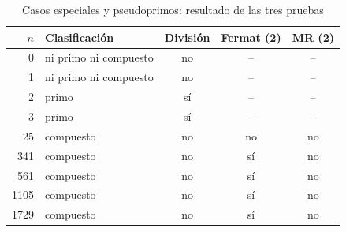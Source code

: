 \begin{table}[H]\centering\small
\caption{Casos especiales y pseudoprimos: resultado de las tres pruebas}
\label{tab:casos_propuesto1}
\begin{tabular}{rlccc}\toprule
$n$ & Clasificación & División & Fermat (2) & MR (2) \\
\midrule
0 & ni primo ni compuesto & no & -- & -- \\
1 & ni primo ni compuesto & no & -- & -- \\
2 & primo & sí & -- & -- \\
3 & primo & sí & -- & -- \\
25 & compuesto & no & no & no \\
341 & compuesto & no & sí & no \\
561 & compuesto & no & sí & no \\
1105 & compuesto & no & sí & no \\
1729 & compuesto & no & sí & no \\
\bottomrule\end{tabular}\end{table}
